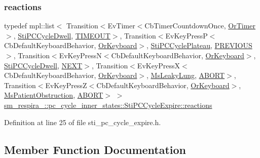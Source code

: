 \subsubsection{\texorpdfstring{reactions}{reactions}}
{\footnotesize\ttfamily typedef mpl\+::list$<$ Transition$<$Ev\+Timer$<$Cb\+Timer\+Countdown\+Once, \hyperlink{classsm__respira__1_1_1OrTimer}{Or\+Timer}$>$, \hyperlink{structsm__respira__1_1_1pc__cycle__inner__states_1_1StiPCCycleDwell}{Sti\+P\+C\+Cycle\+Dwell}, \hyperlink{structsm__respira__1_1_1pc__cycle__inner__states_1_1StiPCCycleExpire_1_1TIMEOUT}{T\+I\+M\+E\+O\+UT}$>$, Transition$<$Ev\+Key\+PressP$<$Cb\+Default\+Keyboard\+Behavior, \hyperlink{classsm__respira__1_1_1OrKeyboard}{Or\+Keyboard}$>$, \hyperlink{structsm__respira__1_1_1pc__cycle__inner__states_1_1StiPCCyclePlateau}{Sti\+P\+C\+Cycle\+Plateau}, \hyperlink{structsm__respira__1_1_1pc__cycle__inner__states_1_1StiPCCycleExpire_1_1PREVIOUS}{P\+R\+E\+V\+I\+O\+US}$>$, Transition$<$Ev\+Key\+PressN$<$Cb\+Default\+Keyboard\+Behavior, \hyperlink{classsm__respira__1_1_1OrKeyboard}{Or\+Keyboard}$>$, \hyperlink{structsm__respira__1_1_1pc__cycle__inner__states_1_1StiPCCycleDwell}{Sti\+P\+C\+Cycle\+Dwell}, \hyperlink{structsm__respira__1_1_1pc__cycle__inner__states_1_1StiPCCycleExpire_1_1NEXT}{N\+E\+XT}$>$, Transition$<$Ev\+Key\+PressX$<$Cb\+Default\+Keyboard\+Behavior, \hyperlink{classsm__respira__1_1_1OrKeyboard}{Or\+Keyboard}$>$, \hyperlink{classsm__respira__1_1_1MsLeakyLung}{Ms\+Leaky\+Lung}, \hyperlink{classABORT}{A\+B\+O\+RT}$>$, Transition$<$Ev\+Key\+PressZ$<$Cb\+Default\+Keyboard\+Behavior, \hyperlink{classsm__respira__1_1_1OrKeyboard}{Or\+Keyboard}$>$, \hyperlink{classsm__respira__1_1_1MsPatientObstruction}{Ms\+Patient\+Obstruction}, \hyperlink{classABORT}{A\+B\+O\+RT}$>$ $>$ \hyperlink{structsm__respira__1_1_1pc__cycle__inner__states_1_1StiPCCycleExpire_ae08aad9407ec76716ef92383f184df67}{sm\+\_\+respira\+\_\+::pc\+\_\+cycle\+\_\+inner\+\_\+states\+::\+Sti\+P\+C\+Cycle\+Expire\+::reactions}}



Definition at line 25 of file sti\+\_\+pc\+\_\+cycle\+\_\+expire.\+h.



\subsection{Member Function Documentation}
\mbox{\label{structsm__respira__1_1_1pc__cycle__inner__states_1_1StiPCCycleExpire_ad5ee63b26397bf9c9b7388f01e2113a1}} 
